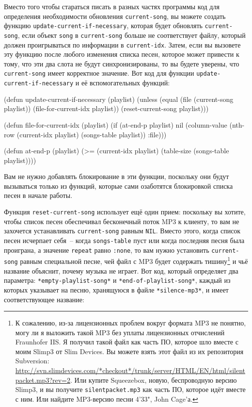 Вместо того чтобы стараться писать в разных частях программы код для определения
необходимости обновления \lstinline{current-song}, вы можете создать функцию
\lstinline{update-current-if-necessary}, которая будет обновлять \lstinline{current-song}, если
объект \lstinline{song} в \lstinline{current-song} больше не соответствует файлу, который должен
проигрываться по информации в \lstinline{current-idx}. Затем, если вы вызовете эту функцию
после любого изменения списка песен, которое может привести к тому, что эти два слота не
будут синхронизированы, то вы будете уверены, что \lstinline{current-song} имеет корректное
значение.  Вот код для функции \lstinline{update-current-if-necessary} и её вспомогательных
функций:

\begin{myverb}
(defun update-current-if-necessary (playlist)
  (unless (equal (file (current-song playlist))
                 (file-for-current-idx playlist))
    (reset-current-song playlist)))

(defun file-for-current-idx (playlist)
  (if (at-end-p playlist)
    nil
    (column-value (nth-row (current-idx playlist) (songs-table playlist)) :file)))

(defun at-end-p (playlist)
  (>= (current-idx playlist) (table-size (songs-table playlist))))
\end{myverb}

Вам не нужно добавлять блокирование в эти функции, поскольку они будут вызываться только
из функций, которые сами озаботятся блокировкой списка песен в начале работы.

Функция \lstinline{reset-current-song} использует ещё один прием: поскольку вы хотите, чтобы
список песен обеспечивал бесконечный поток MP3 к клиенту, то вам не захочется
устанавливать \lstinline{current-song} равным \lstinline{NIL}. Вместо этого, когда список песен
исчерпает себя~-- когда \lstinline{songs-table} пуст или когда последняя песня была
проиграна, а значение \lstinline{repeat} равно \lstinline{:none}, то вам нужно установить
\lstinline{current-song} равным специальной песне, чей файл с MP3 будет содержать
тишину\footnote{К сожалению, из-за лицензионных проблем вокруг формата MP3 не понятно,
  могу ли я выложить такой MP3 без уплаты лицензионных отчислений Fraunhofer IIS.  Я
  получил такой файл как часть ПО, которое шло вместе с моим Slimp3 от Slim Devices. Вы
  можете взять этот файл из их репозитория Subversion:
  \url{http://svn.slimdevices.com/*checkout*/trunk/server/HTML/EN/html/silentpacket.mp3?rev=2}.
  Или купите Squeezebox, новую, беспроводную версию Slimp3, и вы получите
  \lstinline{silentpacket.mp3} как часть ПО, которое идёт вместе с ним. Или найдите MP3-версию
  песни 4'33", John Cage'а.} и чьё название объяснит, почему музыка не играет.  Вот код,
который определяет два параметра: \lstinline{*empty-playlist-song*} и
\lstinline{*end-of-playlist-song*}, каждый из которых указывает на песню, хранящуюся в файле
\lstinline{*silence-mp3*}, и имеет соответствующее название:


